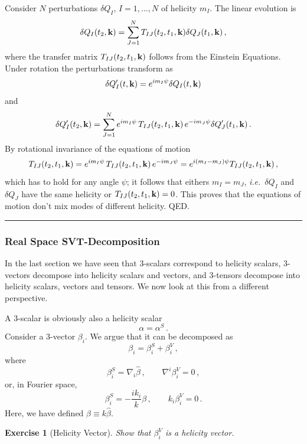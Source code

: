 \documentclass[12pt,letterpaper,rotate]{article}
\def\beq{\begin{equation}}
\def\eeq{\end{equation}}
\newtheorem{thm}{Exercise}
\begin{document}
{Consider $N$ perturbations $\delta Q_I$, $I=1, \dots, N$ of helicity $m_I$.
The linear evolution is
\beq
\delta Q_I(t_2, {\bf k}) = \sum_{J=1}^N T_{IJ}(t_2,t_1, {\bf k}) \delta Q_J(t_1, {\bf k})\, ,
\eeq
where the transfer matrix $T_{IJ}(t_2,t_1, {\bf k}) $ follows from the Einstein Equations.
Under rotation the perturbations transform as
\beq
\delta Q_I' (t, {\bf k})= e^{i m_I \psi} \delta Q_I(t, {\bf k})
\eeq
and
\beq
\delta Q_I'(t_2, {\bf k}) = \sum_{J=1}^N e^{i m_I \psi} \, T_{IJ}(t_2,t_1, {\bf k})\, e^{-im_J \psi}\delta Q_J'(t_1, {\bf k})\, .
\eeq
By rotational invariance of the equations of motion
\beq
T_{IJ}(t_2,t_1, {\bf k}) = e^{i m_I \psi} \, T_{IJ}(t_2,t_1, {\bf k})\, e^{-im_J \psi} = e^{i(m_I-m_J)\psi } T_{IJ}(t_2,t_1, {\bf k})\, ,
\eeq
which has to hold for any angle $\psi$; it follows that eithers $m_I=m_J$, {\it i.e.}~$\delta Q_I$ and $\delta Q_J$ have the same helicity or $T_{IJ}(t_2,t_1, {\bf k})=0$.
This proves that the equations of motion don't mix modes of different helicity. QED.
\vspace{0.2cm}  \hrule
 \vspace{0.5cm}
 
 
\subsubsection{Real Space SVT-Decomposition}
 
In the last section we have seen that 3-scalars correspond to helicity scalars, 3-vectors decompose into helicity scalars and vectors, and 3-tensors decompose into  helicity scalars, vectors and tensors.
We now look at this from a different perspective.

A 3-scalar is obviously also a helicity scalar
\beq
\alpha = \alpha^S\, .
\eeq
Consider a 3-vector $\beta_i$. We argue that it can be decomposed as
\beq
\beta_i = \beta_i^S + \beta_i^V\, ,
\eeq
where
\beq
\beta_i^S = \nabla_i \hat \beta\, , \qquad \nabla^i \beta_i^V = 0\, ,
\eeq
or, in Fourier space,
\beq
\beta_i^S =-\frac{i k_i}{k}  \beta\, , \qquad k_i \beta_i^V = 0\, .
\eeq
Here, we have defined $\beta \equiv k \hat \beta$.

\begin{thm}[Helicity Vector]
Show that $\beta_i^V$ is a helicity vector.
\end{thm}

}
\end{document}

